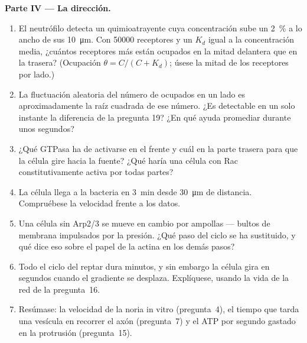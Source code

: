 \begin{problem}
\medskip
\noindent\textbf{Parte IV --- La dirección.}
\begin{enumerate}[resume]
  \item El neutrófilo detecta un quimioatrayente cuya concentración sube
        un \qty{2}{\%} a lo ancho de sus \qty{10}{\micro m}. Con
        \num{50000} receptores y un $K_{d}$ igual a la concentración
        media, ¿cuántos receptores más están ocupados en la mitad
        delantera que en la trasera? (Ocupación $\theta = C/(C +
        K_{d})$; úsese la mitad de los receptores por lado.)
  \item La fluctuación aleatoria del número de ocupados en un lado es
        aproximadamente la raíz cuadrada de ese número. ¿Es detectable en
        un solo instante la diferencia de la pregunta 19? ¿En qué ayuda
        promediar durante unos segundos?
  \item ¿Qué GTPasa ha de activarse en el frente y cuál en la parte
        trasera para que la célula gire hacia la fuente? ¿Qué haría una
        célula con Rac constitutivamente activa por todas partes?
  \item La célula llega a la bacteria en \qty{3}{min} desde
        \qty{30}{\micro m} de distancia. Compruébese la velocidad frente
        a los datos.
  \item Una célula sin Arp2/3 se mueve en cambio por ampollas --- bultos
        de membrana impulsados por la presión. ¿Qué paso del ciclo se ha
        sustituido, y qué dice eso sobre el papel de la actina en los
        demás pasos?
  \item Todo el ciclo del reptar dura minutos, y sin embargo la célula
        gira en segundos cuando el gradiente se desplaza. Explíquese,
        usando la vida de la red de la pregunta~16.
  \item Resúmase: la velocidad de la noria in vitro (pregunta~4), el
        tiempo que tarda una vesícula en recorrer el axón (pregunta~7) y
        el ATP por segundo gastado en la protrusión (pregunta~15).
\end{enumerate}
\end{problem}
